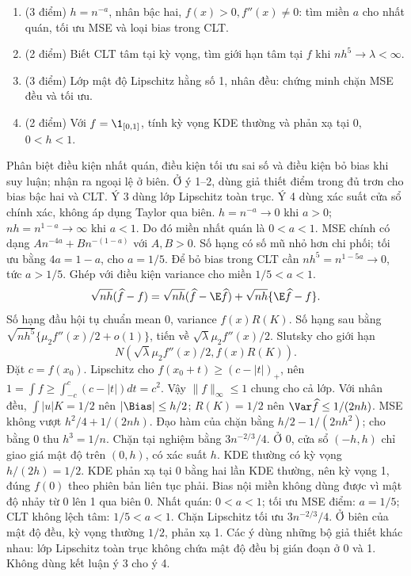\begin{problem}
\begin{enumerate}
\item (3 điểm) $h=n^{-a}$, nhân bậc hai, $f(x)>0,f''(x)\ne0$: tìm miền $a$ cho nhất quán, tối ưu MSE và loại bias trong CLT.
\item (2 điểm) Biết CLT tâm tại kỳ vọng, tìm giới hạn tâm tại $f$ khi $nh^5\to\lambda<\infty$.
\item (3 điểm) Lớp mật độ Lipschitz hằng số 1, nhân đều: chứng minh chặn MSE đều và tối ưu.
\item (2 điểm) Với $f=\1_{[0,1]}$, tính kỳ vọng KDE thường và phản xạ tại 0, $0<h<1$.
\end{enumerate}
\end{problem}
\begin{solution}
Phân biệt điều kiện nhất quán, điều kiện tối ưu sai số và điều kiện bỏ bias khi suy luận; nhận ra ngoại lệ ở biên.
Ở ý 1--2, dùng giả thiết điểm trong đủ trơn cho bias bậc hai và CLT. Ý 3 dùng lớp Lipschitz toàn trục. Ý 4 dùng xác suất cửa sổ chính xác, không áp dụng Taylor qua biên.
$h=n^{-a}\to0$ khi $a>0$; $nh=n^{1-a}\to\infty$ khi $a<1$. Do đó miền nhất quán là $0<a<1$.
MSE chính có dạng $An^{-4a}+Bn^{-(1-a)}$ với $A,B>0$. Số hạng có số mũ nhỏ hơn chi phối; tối ưu bằng $4a=1-a$, cho $a=1/5$.
Để bỏ bias trong CLT cần $nh^5=n^{1-5a}\to0$, tức $a>1/5$. Ghép với điều kiện variance cho miền $1/5<a<1$.
\[
 \sqrt{nh}(\widehat f-f)=\sqrt{nh}(\widehat f-\E\widehat f)
 +\sqrt{nh}\{\E\widehat f-f\}.
\]
Số hạng đầu hội tụ chuẩn mean 0, variance $f(x)R(K)$.
Số hạng sau bằng $\sqrt{nh^5}\{\mu_2f''(x)/2+o(1)\}$, tiến về $\sqrt\lambda\mu_2f''(x)/2$.
Slutsky cho giới hạn
\[N(\sqrt\lambda\mu_2f''(x)/2,f(x)R(K)).\]
Đặt $c=f(x_0)$. Lipschitz cho $f(x_0+t)\ge(c-|t|)_+$, nên $1=\int f\ge\int_{-c}^c(c-|t|)dt=c^2$. Vậy $\|f\|_\infty\le1$ chung cho cả lớp.
Với nhân đều, $\int|u|K=1/2$ nên $|\Bias|\le h/2$; $R(K)=1/2$ nên $\Var\widehat f\le1/(2nh)$.
MSE không vượt $h^2/4+1/(2nh)$. Đạo hàm của chặn bằng $h/2-1/(2nh^2)$; cho bằng 0 thu $h^3=1/n$. Chặn tại nghiệm bằng $3n^{-2/3}/4$.
Ở 0, cửa sổ $(-h,h)$ chỉ giao giá mật độ trên $(0,h)$, có xác suất $h$. KDE thường có kỳ vọng $h/(2h)=1/2$.
KDE phản xạ tại 0 bằng hai lần KDE thường, nên kỳ vọng 1, đúng $f(0)$ theo phiên bản liên tục phải. Bias nội miền không dùng được vì mật độ nhảy từ 0 lên 1 qua biên 0.
Nhất quán: $0<a<1$; tối ưu MSE điểm: $a=1/5$; CLT không lệch tâm: $1/5<a<1$. Chặn Lipschitz tối ưu $3n^{-2/3}/4$. Ở biên của mật độ đều, kỳ vọng thường $1/2$, phản xạ 1.
Các ý dùng những bộ giả thiết khác nhau: lớp Lipschitz toàn trục không chứa mật độ đều bị gián đoạn ở 0 và 1. Không dùng kết luận ý 3 cho ý 4.
\end{solution}


